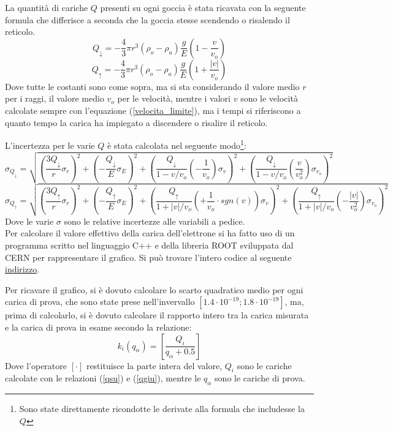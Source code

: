 \documentclass{article}
\begin{document}
La quantità di cariche $Q$ presenti su ogni goccia è stata ricavata con la seguente formula che differisce a seconda che la goccia stesse scendendo o risalendo il reticolo.
\begin{equation}
	Q_{\downarrow}=-\frac{4}{3}\pi r^3(\rho_o-\rho_a)\frac{g}{E}\left(1-\frac{v}{v_o}\right)
	\label{qsu}
\end{equation}
\begin{equation}
	Q_{\uparrow}=-\frac{4}{3}\pi r^3(\rho_o-\rho_a)\frac{g}{E}\left(1+\frac{|v|}{v_o}\right)
	\label{qgiu}
\end{equation}
Dove tutte le costanti sono come sopra, ma si sta considerando il valore medio $r$ per i raggi, il valore medio $v_o$ per le velocità, mentre i valori $v$ sono le velocità calcolate sempre con l'equazione (\ref{velocita_limite}), ma i tempi si riferiscono a quanto tempo la carica ha impiegato a discendere o risalire il reticolo.

L'incertezza per le varie $Q$ è stata calcolata nel seguente modo\footnote{Sono state direttamente ricondotte le derivate alla formula che includesse la $Q$}:
\begin{equation}
	\sigma_{Q_{\downarrow}}=\sqrt{\left(\frac{3Q_{\downarrow}}{r}\sigma_r\right)^2+\left(-\frac{Q_{\downarrow}}{E}\sigma_E\right)^2+\left(\frac{Q_{\downarrow}}{1-v/v_o}\left(-\frac{1}{v_o}\right)\sigma_v\right)^2+\left(\frac{Q_{\downarrow}}{1-v/v_o}\left(\frac{v}{v_o^2}\right)\sigma_{v_o}\right)^2}
\end{equation}
\begin{equation}
	\sigma_{Q_{\uparrow}}=\sqrt{\left(\frac{3Q_{\uparrow}}{r}\sigma_r\right)^2+\left(-\frac{Q_{\uparrow}}{E}\sigma_E\right)^2+\left(\frac{Q_{\uparrow}}{1+|v|/v_o}\left(+\frac{1}{v_o}\cdot sgn(v)\right)\sigma_v\right)^2+\left(\frac{Q_{\uparrow}}{1+|v|/v_o}\left(-\frac{|v|}{v_o^2}\right)\sigma_{v_o}\right)^2}
\end{equation}
Dove le varie $\sigma$ sono le relative incertezze alle variabili a pedice.\\

Per calcolare il valore effettivo della carica dell'elettrone si ha fatto uso di un programma scritto nel linguaggio C++ e della libreria ROOT sviluppata dal CERN per rappresentare il grafico. Si può trovare l'intero codice al seguente \href{https://github.com/definetly-not-carl/millikan/blob/master/millikan.cpp}{indirizzo}.

Per ricavare il grafico, si è dovuto calcolare lo scarto quadratico medio per ogni carica di prova, che sono state prese nell'invervallo $[1.4\cdot10^{-19};1.8\cdot 10^{-19}]$, ma, prima di calcolarlo, si è dovuto calcolare il rapporto intero tra la carica misurata e la carica di prova in esame secondo la relazione:
\begin{equation}
	k_i(q_\alpha)=\left[\frac{Q_i}{q_{\alpha}+0.5}\right]
\end{equation}
Dove l'operatore $[\cdot]$ restituisce la parte intera del valore, $Q_i$ sono le cariche calcolate con le relazioni (\ref{qsu}) e (\ref{qgiu}), mentre le $q_{\alpha}$ sono le cariche di prova.\\
\end{document}
